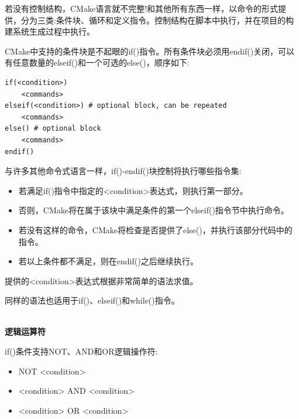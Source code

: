 
若没有控制结构，CMake语言就不完整!和其他所有东西一样，以命令的形式提供，分为三类:条件块、循环和定义指令。控制结构在脚本中执行，并在项目的构建系统生成过程中执行。


CMake中支持的条件块是不起眼的if()指令。所有条件块必须用endif()关闭，可以有任意数量的elseif()和一个可选的else()，顺序如下:

\begin{lstlisting}[style=styleCMake]
if(<condition>)
	<commands>
elseif(<condition>) # optional block, can be repeated
	<commands>
else() # optional block
	<commands>
endif()
\end{lstlisting}

与许多其他命令式语言一样，if()-endif()块控制将执行哪些指令集:

\begin{itemize}
\item 
若满足if()指令中指定的<condition>表达式，则执行第一部分。

\item 
否则，CMake将在属于该块中满足条件的第一个elseif()指令节中执行命令。

\item 
若没有这样的命令，CMake将检查是否提供了else()，并执行该部分代码中的指令。

\item 
若以上条件都不满足，则在endif()之后继续执行。
\end{itemize}

提供的<condition>表达式根据非常简单的语法求值。


同样的语法也适用于if()、elseif()和while()指令。

\hspace*{\fill} \\ %
\noindent
\textbf{逻辑运算符}

if()条件支持NOT、AND和OR逻辑操作符:

\begin{itemize}
\item 
NOT <condition>

\item 
<condition> AND <condition>

\item 
<condition> OR <condition>
\end{itemize}

